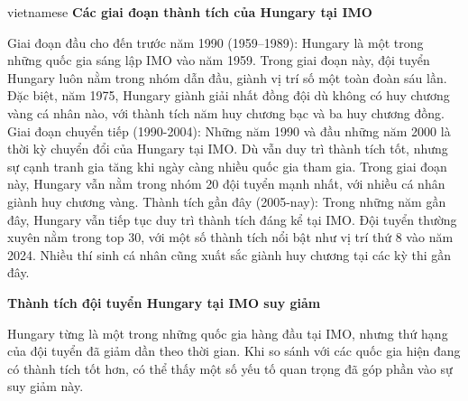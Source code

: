 \documentclass{article}
\begin{document}
\begin{otherlanguage*}{vietnamese}
\textbf{Các giai đoạn thành tích của Hungary tại IMO}
\begin{itemize}[topsep=0pt, partopsep=0pt, itemsep=0pt]
    \ii Giai đoạn đầu cho đến trước năm 1990 (1959–1989): Hungary là một trong những quốc gia sáng lập IMO vào năm 1959.
    Trong giai đoạn này, đội tuyển Hungary luôn nằm trong nhóm dẫn đầu, giành vị trí số một toàn đoàn sáu lần.
    Đặc biệt, năm 1975, Hungary giành giải nhất đồng đội dù không có huy chương vàng cá nhân nào, với thành tích năm huy chương bạc và ba huy chương đồng.
    \ii Giai đoạn chuyển tiếp (1990-2004): Những năm 1990 và đầu những năm 2000 là thời kỳ chuyển đổi của Hungary tại IMO.
    Dù vẫn duy trì thành tích tốt, nhưng sự cạnh tranh gia tăng khi ngày càng nhiều quốc gia tham gia.
    Trong giai đoạn này, Hungary vẫn nằm trong nhóm 20 đội tuyển mạnh nhất, với nhiều cá nhân giành huy chương vàng.
    \ii Thành tích gần đây (2005-nay): Trong những năm gần đây, Hungary vẫn tiếp tục duy trì thành tích đáng kể tại IMO.
    Đội tuyển thường xuyên nằm trong top 30, với một số thành tích nổi bật như vị trí thứ 8 vào năm 2024.
    Nhiều thí sinh cá nhân cũng xuất sắc giành huy chương tại các kỳ thi gần đây.
\end{itemize}

\textbf{Thành tích đội tuyển Hungary tại IMO suy giảm}

Hungary từng là một trong những quốc gia hàng đầu tại IMO, nhưng thứ hạng của đội tuyển đã giảm dần theo thời gian.
Khi so sánh với các quốc gia hiện đang có thành tích tốt hơn, có thể thấy một số yếu tố quan trọng đã góp phần vào sự suy giảm này.


\end{otherlanguage*}
\end{document}
